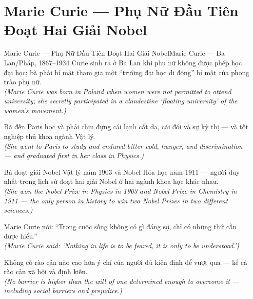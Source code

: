 \section{Marie Curie --- Phụ Nữ Đầu Tiên Đoạt Hai Giải Nobel}
\begin{truyen}{Marie Curie --- Phụ Nữ Đầu Tiên Đoạt Hai Giải Nobel}{Marie Curie --- Ba Lan/Pháp, 1867--1934}
 Curie sinh ra ở Ba Lan khi phụ nữ không được phép học đại học; bà phải bí mật tham gia một ``trường đại học di động'' bí mật của phong trào phụ nữ.\\[4pt]
\textit{(Marie Curie was born in Poland when women were not permitted to attend university; she secretly participated in a clandestine `floating university' of the women's movement.)}

Bà đến Paris học và phải chịu đựng cái lạnh cắt da, cái đói và sự kỳ thị --- và tốt nghiệp thủ khoa ngành Vật lý.\\[4pt]
\textit{(She went to Paris to study and endured bitter cold, hunger, and discrimination --- and graduated first in her class in Physics.)}

Bà đoạt giải Nobel Vật lý năm 1903 và Nobel Hóa học năm 1911 --- người duy nhất trong lịch sử đoạt hai giải Nobel ở hai ngành khoa học khác nhau.\\[4pt]
\textit{(She won the Nobel Prize in Physics in 1903 and Nobel Prize in Chemistry in 1911 --- the only person in history to win two Nobel Prizes in two different sciences.)}

Marie Curie nói: ``Trong cuộc sống không có gì đáng sợ, chỉ có những thứ cần được hiểu.''\\[4pt]
\textit{(Marie Curie said: `Nothing in life is to be feared, it is only to be understood.')}

\end{truyen}
\begin{baihoc}
  Không có rào cản nào cao hơn ý chí của người đủ kiên định để vượt qua --- kể cả rào cản xã hội và định kiến.\\[4pt]
  \textit{(No barrier is higher than the will of one determined enough to overcome it --- including social barriers and prejudice.)}
\end{baihoc}

